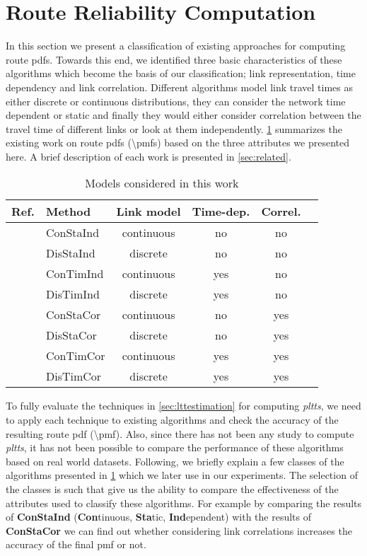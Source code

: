 \section{Route Reliability Computation}
\label{sec:methods}
In this section we present a classification of existing approaches for computing route pdfs. Towards this end, we identified three basic characteristics of these algorithms which become the basis of our classification; link representation, time dependency and link correlation. Different algorithms model link travel times as either discrete or continuous distributions, they can consider the network time dependent or static and finally they would either consider correlation between the travel time of different links or look at them independently. \cref{tab:methods} summarizes the existing work on route pdfs (\textbackslash pmfs) based on the three attributes we presented here. A brief description of each work is presented in \cref{sec:related}.

\begin{table}
\centering
\begin{tabular}{| l || l | c | c | c | c|}
\hline
Ref. & Method & Link model & Time-dep. & Correl. \\
\hline    \hline
\cite{Frank69} & ConStaInd & continuous  & no & no\\ \hline
               & DisStaInd & discrete & no & no\\ \hline
               & ConTimInd & continuous & yes & no\\ \hline
\cite{Miller-Hooks98,Miller-Hooks00, Nie09b} & DisTimInd & discrete & yes & no\\ \hline
\cite{Seshadri10, Zockaei13,Bi-Yu13} & ConStaCor & continuous & no & yes\\ \hline
\cite{Nie06,Hua10,Fan05} & DisStaCor & discrete & no & yes\\ \hline
\cite{Dong12} & ConTimCor & continuous & yes & yes\\ \hline
\cite{Nie09a} & DisTimCor & discrete & yes & yes\\ \hline
\end{tabular}
\caption{Models considered in this work}
\label{tab:methods}
\end{table}

To fully evaluate the techniques in \cref{sec:lttestimation} for computing \textit{pltts}, we need to apply each technique to existing algorithms and check the accuracy of the resulting route pdf (\textbackslash pmf). Also, since there has not been any study to compute \textit{pltts}, it has not been possible to compare the performance of these algorithms based on real world datasets. Following, we briefly explain a few classes of the algorithms presented in \cref{tab:methods} which we later use in our experiments. The selection of the classes is such that give us the ability to compare the effectiveness of the attributes used to classify these algorithms. For example by comparing the results of \textbf{ConStaInd} (\textbf{Con}tinuous, \textbf{Sta}tic, \textbf{Ind}ependent) with the results of \textbf{ConStaCor} we can find out whether considering link correlations increases the accuracy of the final pmf or not.

